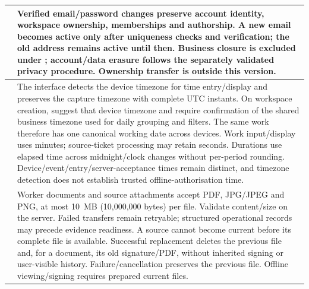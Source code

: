 {\begin{longtable}{L{0.12}L{0.88}}
\midrule
{}\label{br:042}\textbf{} & Verified email/password changes preserve account identity, workspace ownership, memberships and authorship. A new email becomes active only after uniqueness checks and verification; the old address remains active until then. Business closure is excluded under ; account/data erasure follows the separately validated privacy procedure. Ownership transfer is outside this version. \\
\midrule
{}\label{br:043}\textbf{} & The interface detects the device timezone for time entry/display and preserves the capture timezone with complete UTC instants. On workspace creation, suggest that device timezone and require confirmation of the shared business timezone used for daily grouping and filters. The same work therefore has one canonical working date across devices. Work input/display uses minutes; source-ticket processing may retain seconds. Durations use elapsed time across midnight/clock changes without per-period rounding. Device/event/entry/server-acceptance times remain distinct, and timezone detection does not establish trusted offline-authorisation time. \\
\midrule
{}\label{br:044}\textbf{} & Worker documents and source attachments accept PDF, JPG/JPEG and PNG, at most 10~MB (10,000,000 bytes) per file. Validate content/size on the server. Failed transfers remain retryable; structured operational records may precede evidence readiness. A source cannot become current before its complete file is available. Successful replacement deletes the previous file and, for a document, its old signature/PDF, without inherited signing or user-visible history. Failure/cancellation preserves the previous file. Offline viewing/signing requires prepared current files. \\
\end{longtable}
}
